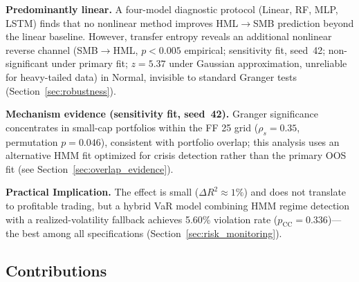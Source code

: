 \documentclass[sigconf,anonymous]{acmart}
\begin{document}
\textbf{Predominantly linear.} A four-model diagnostic protocol (Linear, RF,
MLP, LSTM) finds that no nonlinear method improves HML$\to$SMB prediction beyond
the linear baseline. However, transfer entropy reveals an additional nonlinear
reverse channel (SMB$\to$HML, $p < 0.005$ empirical; sensitivity fit, seed~42;
non-significant under primary fit; $z = 5.37$ under Gaussian approximation,
unreliable for heavy-tailed data) in Normal,
invisible to standard Granger tests (Section~\ref{sec:robustness}).

\textbf{Mechanism evidence (sensitivity fit, seed~42).} Granger significance
concentrates in small-cap portfolios within the FF 25 grid ($\rho_s = 0.35$,
permutation $p = 0.046$), consistent with portfolio overlap; this analysis uses
an alternative HMM fit optimized for crisis detection rather than the primary
OOS fit (see Section~\ref{sec:overlap_evidence}).

\textbf{Practical Implication.} The effect is small ($\Delta R^2 \approx 1\%$)
and does not translate to profitable trading, but a hybrid VaR model combining
HMM regime detection with a realized-volatility fallback achieves 5.60\%
violation rate ($p_{\text{CC}} = 0.336$)---the best among all specifications
(Section~\ref{sec:risk_monitoring}).

\subsection{Contributions}
\end{document}
